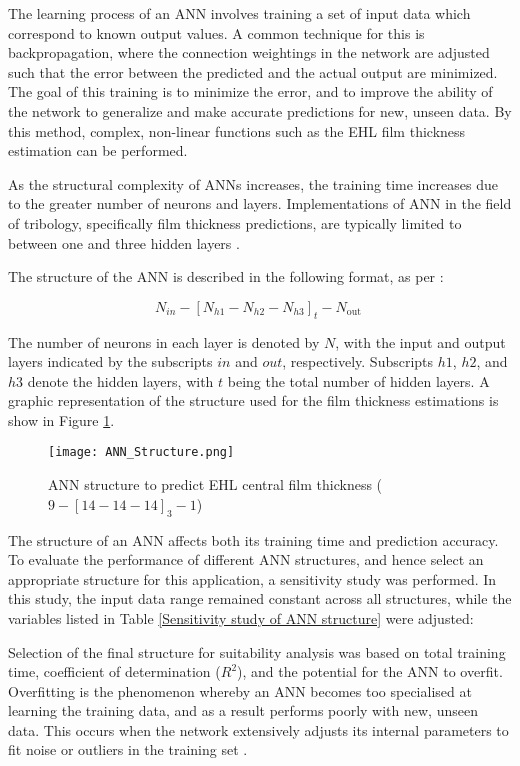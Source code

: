 The learning process of an ANN involves training a set of input data which correspond to known output values. A common technique for this is backpropagation, where the connection weightings in the network are adjusted such that the error between the predicted and the actual output are minimized. The goal of this training is to minimize the error, and to improve the ability of the network to generalize and make accurate predictions for new, unseen data. By this method, complex, non-linear functions such as the EHL film thickness estimation can be performed.

As the structural complexity of ANNs increases, the training time increases due to the greater number of neurons and layers. Implementations of ANN in the field of tribology, specifically film thickness predictions, are typically limited to between one and three hidden layers \cite{Marian2021}.

The structure of the ANN is described in the following format, as per \cite{Zhang2002}:

\begin{equation}
	N_{i n}-\left[N_{h 1}-N_{h 2}-N_{h 3}\right]_t-N_{\text {out }}
\end{equation}

The number of neurons in each layer is denoted by $N$, with the input and output layers indicated by the subscripts $in$ and $out$, respectively. Subscripts $h1$, $h2$, and $h3$ denote the hidden layers, with $t$ being the total number of hidden layers. A graphic representation of the structure used for the film thickness estimations is show in Figure \ref{ANN structure}.

\begin{figure}
	\centering  
	\texttt{[image: ANN\_Structure.png]}
	\caption{ANN structure to predict EHL central film thickness ($9-[14-14-14]_3-1$)}
	\label{ANN structure}
\end{figure} 

The structure of an ANN affects both its training time and prediction accuracy. To evaluate the performance of different ANN structures, and hence select an appropriate structure for this application, a sensitivity study was performed. In this study, the input data range remained constant across all structures, while the variables listed in Table \ref{Sensitivity study of ANN structure} were adjusted:

Selection of the final structure for suitability analysis was based on total training time, coefficient of determination ($R^2$), and the potential for the ANN to overfit. Overfitting is the phenomenon whereby an ANN becomes too specialised at learning the training data, and as a result performs poorly with new, unseen data. This occurs when the network extensively adjusts its internal parameters to fit noise or outliers in the training set \cite{Ying2019}.

